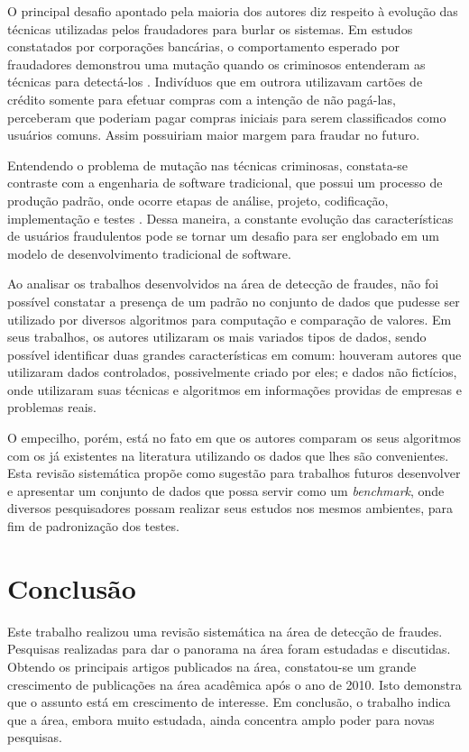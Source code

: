\documentclass[smallextended]{svjour3}
\begin{document}
O principal desafio apontado pela maioria dos autores diz respeito à evolução das técnicas utilizadas pelos fraudadores para burlar os sistemas. Em estudos constatados por corporações bancárias, o comportamento esperado por fraudadores demonstrou uma mutação quando os criminosos entenderam as técnicas para detectá-los \citep{Bolton2002}. Indivíduos que em outrora utilizavam cartões de crédito somente para efetuar compras com a intenção de não pagá-las, perceberam que poderiam pagar compras iniciais para serem classificados como usuários comuns. Assim possuiriam maior margem para fraudar no futuro.

Entendendo o problema de mutação nas técnicas criminosas, constata-se contraste com a engenharia de software tradicional, que possui um processo de produção padrão, onde ocorre etapas de análise, projeto, codificação, implementação e testes \citep{sommervillesoftware}. Dessa maneira, a constante evolução das características de usuários fraudulentos pode se tornar um desafio para ser englobado em um modelo de desenvolvimento tradicional de software. 

Ao analisar os trabalhos desenvolvidos na área de detecção de fraudes, não foi possível constatar a presença de um padrão no conjunto de dados que pudesse ser utilizado por diversos algoritmos para computação e comparação de valores. Em seus trabalhos, os autores utilizaram os mais variados tipos de dados, sendo possível identificar duas grandes características em comum: houveram autores que utilizaram dados controlados, possivelmente criado por eles; e dados não fictícios, onde utilizaram suas técnicas e algoritmos em informações providas de empresas e problemas reais. 

O empecilho, porém, está no fato em que os autores comparam os seus algoritmos com os já existentes na literatura utilizando os dados que lhes são convenientes. Esta revisão sistemática propõe como sugestão para trabalhos futuros desenvolver e apresentar um conjunto de dados que possa servir como um \emph{benchmark}, onde diversos pesquisadores possam realizar seus estudos nos mesmos ambientes, para fim de padronização dos testes. 

\section{Conclusão}
\label{sec:6}

Este trabalho realizou uma revisão sistemática na área de detecção de fraudes. Pesquisas realizadas para dar o panorama na área foram estudadas e discutidas. Obtendo os principais artigos publicados na área, constatou-se um grande crescimento de publicações na área acadêmica após o ano de 2010. Isto demonstra que o assunto está em crescimento de interesse. Em conclusão, o trabalho indica que a área, embora muito estudada, ainda concentra amplo poder para novas pesquisas.
\end{document}
